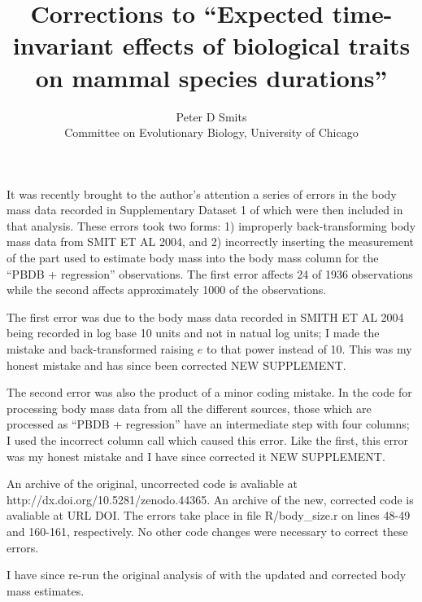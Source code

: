 \documentclass{article}
\title{Corrections to ``Expected time-invariant effects of biological traits on mammal species durations''}
\author{Peter D Smits\\Committee on Evolutionary Biology, University of Chicago}
\begin{document}
\maketitle

It was recently brought to the author's attention a series of errors in the body mass data recorded in Supplementary Dataset 1 of \citep{Smits2015} which were then included in that analysis. These errors took two forms: 1) improperly back-transforming body mass data from SMIT ET AL 2004, and 2) incorrectly inserting the measurement of the part used to estimate body mass into the body mass column for the ``PBDB + regression'' observations. The first error affects 24 of 1936 observations while the second affects approximately 1000 of the observations.

The first error was due to the body mass data recorded in SMITH ET AL 2004 being recorded in log base 10 units and not in natual log units; I made the mistake and back-transformed raising \(e\) to that power instead of 10. This was my honest mistake and has since been corrected NEW SUPPLEMENT.

The second error was also the product of a minor coding mistake. In the code for processing body mass data from all the different sources, those which are processed as ``PBDB + regression'' have an intermediate step with four columns; I used the incorrect column call which caused this error. Like the first, this error was my honest mistake and I have since corrected it NEW SUPPLEMENT.

An archive of the original, uncorrected code is avaliable at http://dx.doi.org/10.5281/zenodo.44365. An archive of the new, corrected code is avaliable at URL DOI. The errors take place in file R/body\_size.r on lines 48-49 and 160-161, respectively. No other code changes were necessary to correct these errors.


I have since re-run the original analysis of \citep{Smits2015} with the updated and corrected body mass estimates. 




%

\end{document}
